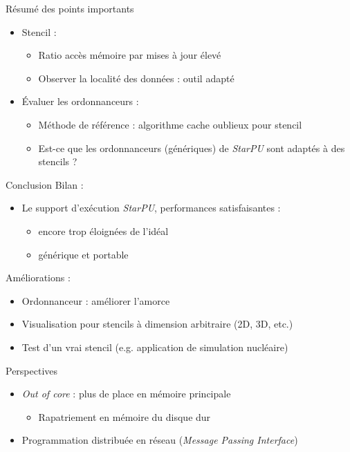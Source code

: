 \documentclass[9pt]{beamer}
\begin{document}
\begin{frame}{\textcolor{inriaGrey}{Résumé des points importants}}
  \begin{itemize}
  \item Stencil :
    \vfill
    \begin{itemize}
    \item Ratio accès mémoire par mises à jour élevé \vfill
    \item Observer la localité des données : outil adapté \vfill
    \end{itemize}
  \item Évaluer les ordonnanceurs :
   \vfill
    \begin{itemize}
    \item Méthode de référence : algorithme cache oublieux pour stencil \vfill
    \item Est-ce que les ordonnanceurs (génériques) de \textit{StarPU} sont
      adaptés à des stencils ?
    \end{itemize}
  \end{itemize}
\end{frame}

\begin{frame}{\textcolor{inriaGrey}{Conclusion}}
  \vfill
  Bilan :
  \vfill
  \begin{itemize}
  \item Le support d'exécution \textit{StarPU}, performances satisfaisantes :
  \vfill
    \begin{itemize}
    \item encore trop éloignées de l'idéal
    \item générique et portable
    \end{itemize}
  \end{itemize}
  \vfill
  Améliorations :
  \vfill
  \begin{itemize}
  \item Ordonnanceur : améliorer l'amorce \vfill
  \item Visualisation pour stencils à dimension arbitraire (2D, 3D, etc.) \vfill
  \item Test d'un vrai stencil (e.g. application de simulation nucléaire)
  \end{itemize}
  \vfill
\end{frame}

\begin{frame}{\textcolor{inriaGrey}{Perspectives}}
  \vfill
  \begin{itemize}
  \item \textit{Out of core} : plus de place en mémoire principale
    \begin{itemize}
    \item Rapatriement en mémoire du disque dur
    \end{itemize}
    \vfill
  \item Programmation distribuée en réseau (\textit{Message Passing Interface})
  \end{itemize}
  \vfill
\end{frame}
\end{document}
